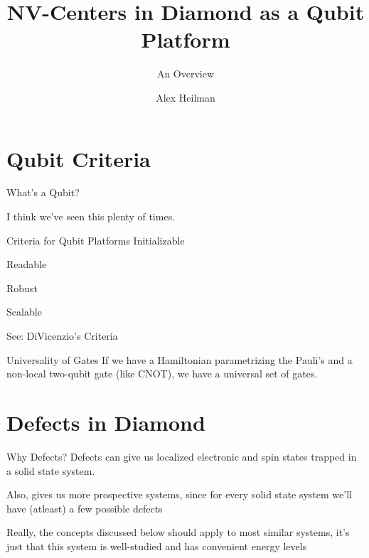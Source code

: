 \documentclass[11pt]{beamer}
\author{Alex Heilman}
\title{NV-Centers in Diamond as a Qubit Platform}
\subtitle{An Overview}
\begin{document}
\begin{frame}
\titlepage
\end{frame}


\section{Qubit Criteria}
\begin{frame}{What's a Qubit?}


I think we've seen this plenty of times.

\end{frame}

\begin{frame}{Criteria for Qubit Platforms}
Initializable

Readable

Robust

Scalable

See: DiVicenzio's Criteria
\end{frame}

\begin{frame}{Universality of Gates}
If we have a Hamiltonian parametrizing the Pauli's and a non-local 
two-qubit gate (like CNOT), we have a universal set of gates.
\end{frame}

\section{Defects in Diamond}
\begin{frame}{Why Defects?}
Defects can give us localized electronic and spin states trapped in a solid state system.

\vspace{.8cm}

Also, gives us more prospective systems, since for every solid state system we'll have (atleast) a few possible defects

\vspace{.8cm}

Really, the concepts discussed below should apply to most similar systems, it's just that this system is well-studied and has convenient energy levels
\end{frame}
\end{document}
